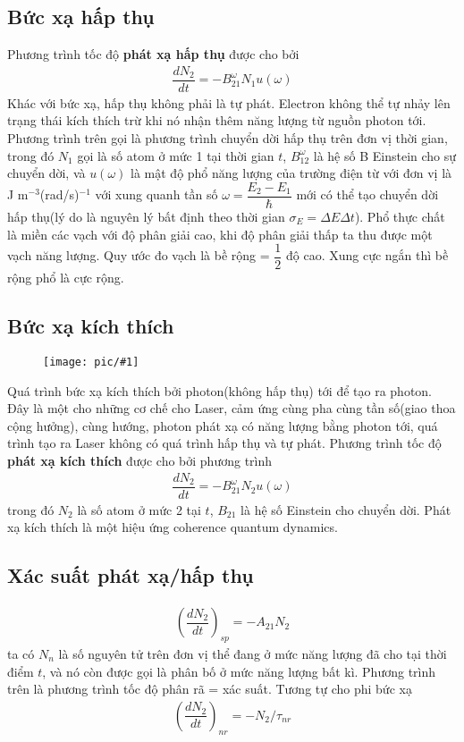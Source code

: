 \documentclass{report}
\newcommand{\image}[1]{
\begin{figure}[H]
	\centering
	\texttt{[image: pic/\#1]}
	\label{#1}
\end{figure}
}
\newcommand{\f}[2]{\dfrac{#1}{#2}}
\begin{document}
\subsection{Bức xạ hấp thụ}
Phương trình tốc độ \textbf{phát xạ hấp thụ} được cho bởi
\begin{gather}
	\f{dN_{2}}{dt} = -B_{21}^{\omega} N_{1} u(\omega)
\end{gather}
Khác với bức xạ, hấp thụ không phải là tự phát. Electron không thể tự nhảy lên trạng thái kích thích trừ khi nó nhận thêm năng lượng từ nguồn photon tới. Phương trình trên gọi là phương trình chuyển dời hấp thụ trên đơn vị thời gian, trong đó $N_{1}$ gọi là số atom ở mức 1 tại thời gian $t$, $B_{12}^{\omega}$ là hệ số B Einstein cho sự chuyển dời, và $u(\omega)$ là mật độ phổ năng lượng của trường điện từ với đơn vị là J m$^{-3}$(rad/s)$^{-1}$ với xung quanh tần số $\omega = \f{E_{2} - E_{1}}{\hbar}$ mới có thể tạo chuyển dời hấp thụ(lý do là nguyên lý bất định theo thời gian $\sigma_{E} = \Delta E \Delta t$). Phổ thực chất là miền các vạch với độ phân giải cao, khi độ phân giải thấp ta thu được một vạch năng lượng. Quy ước đo vạch là bề rộng = $\f{1}{2}$ độ cao. Xung cực ngắn thì bề rộng phổ là cực rộng.
\subsection{Bức xạ kích thích}
\image{kichthich.png}
Quá trình bức xạ kích thích bởi photon(không hấp thụ) tới để tạo ra photon. Đây là một cho những cơ chế cho Laser, cảm ứng cùng pha cùng tần số(giao thoa cộng hưởng), cùng hướng, photon phát xạ có năng lượng bằng photon tới, quá trình tạo ra Laser không có quá trình hấp thụ và tự phát. Phương trình tốc độ \textbf{phát xạ kích thích} được cho bởi phương trình
\begin{gather}
	\f{dN_{2}}{dt} = - B_{21}^{\omega} N_{2} u(\omega)
\end{gather}
trong đó $N_{2}$ là số atom ở mức 2 tại $t$, $B_{21}$ là hệ số Einstein cho chuyển dời. Phát xạ kích thích là một hiệu ứng coherence quantum dynamics.
\subsection{Xác suất phát xạ/hấp thụ}
\begin{gather}
	\left( \f{dN_{2}}{dt} \right)_{sp} = - A_{21} N_{2}
\end{gather}
ta có $N_{n}$ là số nguyên tử trên đơn vị thể đang ở mức năng lượng đã cho tại thời điểm $t$, và nó còn được gọi là phân bố ở mức năng lượng bất kì. Phương trình trên là phương trình tốc độ phân rã = xác suất. Tương tự cho phi bức xạ
\begin{gather}
	\left( \f{dN_{2}}{dt} \right)_{nr} =  - N_{2} / \tau_{nr}
\end{gather}
\end{document}
